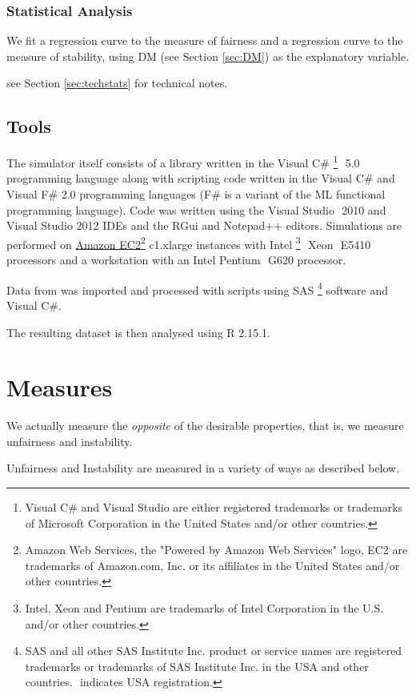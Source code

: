 \documentclass{article}
\begin{document}
\subsubsection{Statistical Analysis}
We fit a regression curve to the measure of fairness and a regression curve to the measure of stability, using DM (see Section \ref{sec:DM}) as the explanatory variable.

see Section \ref{sec:techstats} for technical notes.
\subsection{Tools}
The simulator itself consists of a library written in the Visual C\# \textregistered \footnote{Visual C\# and Visual Studio are either registered trademarks or trademarks of Microsoft Corporation in the United States and/or other countries.} $ $ 5.0 programming language along with scripting code written in the Visual C\# and Visual F\# 2.0 programming languages (F\# is a variant of the ML functional programming language). Code was written using the Visual Studio \textregistered $ $ 2010 and Visual Studio 2012 IDEs and the RGui and Notepad++ editors. Simulations are performed on \href{http://aws.amazon.com/ec2}{Amazon EC2\texttrademark\footnote{Amazon Web Services, the "Powered by Amazon Web Services" logo, EC2 are trademarks of Amazon.com, Inc. or its affiliates in the United States and/or other countries.}} c1.xlarge instances with Intel \textregistered \footnote{Intel, Xeon and Pentium are trademarks of Intel Corporation in the U.S. and/or other countries.} $ $ Xeon \textregistered $ $ E5410 processors and a workstation with an Intel Pentium \textregistered $ $ G620 processor.

Data from \cite{nzes08} was imported and processed with scripts using SAS \textregistered \footnote{SAS and all other SAS Institute Inc. product or service names are registered trademarks or trademarks of SAS Institute Inc. in the USA and other countries. \textregistered $ $ indicates USA registration. } software and Visual C\#.

The resulting dataset is then analysed using R 2.15.1.

\section{Measures}
We actually measure the \emph{opposite} of the desirable properties, that is, we measure unfairness and instability.

Unfairness and Instability are measured in a variety of ways as described below.
\end{document}
